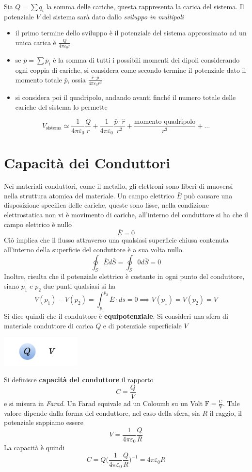 \documentclass[10pt, letterpaper]{report}
\begin{document}
Sia $Q=\sum q_i$ la somma delle cariche, questa rappresenta la carica del sistema. Il potenziale $V$ del sistema sarà dato dallo \textit{sviluppo in multipoli}\begin{itemize}
    \item il primo termine dello sviluppo è il potenziale del sistema approssimato ad un unica carica è $\frac{Q}{4\pi\varepsilon_0 r}$
    \item se $\bar p=\sum \bar p_i$ è la somma di tutti i possibili momenti dei dipoli considerando ogni coppia di cariche, si considera come secondo termine il potenziale dato il momento totale $\bar p$, ossia $\frac{\hat r \cdot \bar p}{4\pi\varepsilon_0 r^2}$
    \item si considera poi il quadripolo, andando avanti finché il numero totale delle cariche del sistema lo permette 
\end{itemize}
$$ V_{\text{sistema}}\simeq \frac{1}{4\pi\varepsilon_0}\frac{Q}{r}+ \frac{1}{4\pi\varepsilon_0}\frac{\bar p\cdot  \hat r}{r^2}+\frac{\text{momento quadripolo}}{r^3}+\dots$$
\flowerLine 
\section{Capacità dei Conduttori}
Nei materiali conduttori, come il metallo, gli elettroni sono liberi di muoversi nella struttura atomica del materiale. Un campo elettrico $\bar E$ può causare una disposizione specifica delle cariche, queste sono fisse, nella condizione elettrostatica non vi è movimento di cariche, all'interno del conduttore si ha che il campo elettrico è nullo 
$$\bar E = 0$$
Ciò implica che il flusso attraverso una qualsiasi superficie chiusa contenuta all'interno della superficie del conduttore è a sua volta nullo. 
$$ \oint_S \bar E d\bar S =  \oint_S 0 d\bar S = 0$$ 
Inoltre, risulta che il potenziale elettrico è costante in ogni punto del conduttore, siano $p_1$ e $p_2$ due punti qualsiasi si ha 
$$ V(p_1)-V(p_2)=\int_{p_1}^{p_2}\bar E \cdot d\bar s=0 \implies V(p_1)=V(p_2)= V$$
Si dice quindi che il conduttore è \textbf{equipotenziale}.
 Si consideri una sfera di materiale conduttore di carica $Q$ e di potenziale superficiale $V$
\begin{center}
    \includegraphics[width=0.3\textwidth]{images/sferaPot.pdf}
\end{center} 
Si definisce \textbf{capacità del conduttore} il rapporto 
$$ C=\frac{Q}{V}$$ 
e si misura in \textit{Farad}. Un Farad equivale ad un Coloumb su un Volt $\text{F}=\frac{\text{C}}{\text{V}}$.
Tale valore dipende dalla forma del conduttore, nel caso della sfera, sia $R$ il raggio, il potenziale sappiamo essere 
$$V=\frac{1}{4\pi\varepsilon_0}\frac{Q}{R}$$
La capacità è quindi 
$$ C=Q\Big(\frac{1}{4\pi\varepsilon_0}\frac{Q}{R} \Big)^{-1}=4\pi\varepsilon_0 R$$
\end{document}
